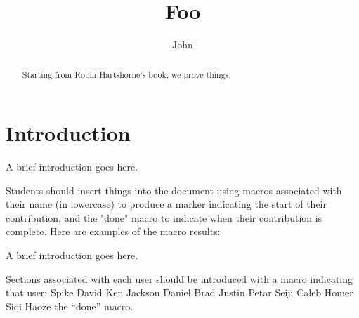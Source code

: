 \documentclass[11pt,notitlepage]{report}
\begin{document}
\title{Foo}
\author{John}
\maketitle

\begin{abstract}
Starting from Robin Hartshorne's book, we prove things.
\end{abstract}


\chapter*{Introduction}
A brief introduction goes here.

Students should insert things into the document using
macros associated with their name (in lowercase) to produce a marker indicating the start of their contribution, and the "done" macro to indicate when their contribution is complete. Here are examples of the macro results:

A brief introduction goes here.

Sections associated with each user should be introduced with a macro indicating that user:
\spike Spike
\david David
\ken Ken
\jackson Jackson
\daniel Daniel
\brad Brad
\justin Justin
\petar Petar
\seiji Seiji
\caleb Caleb
\homer Homer
\siqi Siqi
\haoze Haoze
\done the ``done'' macro.






\end{document}
